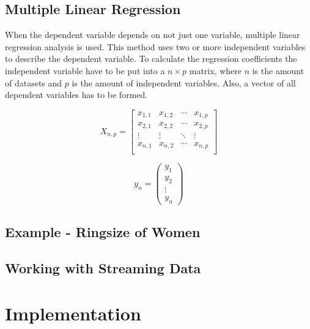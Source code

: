 \subsection{Multiple Linear Regression}

When the dependent variable depends on not just one variable, multiple linear regression analysis is used. This method uses two or more independent variables to describe the dependent variable. To calculate the regression coefficients the independent variable have to be put into a $ n \times p $ matrix, where $ n $ is the amount of datasets and $ p $ is the amount of independent variables. Also, a vector of all dependent variables has to be formed.

\begin{equation}
    X_{n,p} =
        \begin{bmatrix}
            x_{1,1} & x_{1,2} & \cdots & x_{1,p} \\
            x_{2,1} & x_{2,2} & \cdots & x_{2,p} \\
            \vdots & \vdots & \ddots & \vdots \\
            x_{n,1} & x_{n,2} & \cdots & x_{n,p} \\
        \end{bmatrix}
\end{equation}


\begin{equation}
    y_{n} =
        \begin{pmatrix}
            y_{1} \\
            y_{2} \\
            \vdots \\
            y_{n}
        \end{pmatrix}
\end{equation}

\subsection{Example - Ringsize of Women}

\subsection{Working with Streaming Data}

\section{Implementation}
